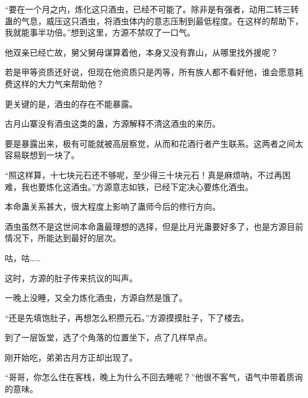 \begin{this_body}
“要在一个月之内，炼化这只酒虫，已经不可能了。除非是有强者，动用二转三转蛊的气息，威压这只酒虫，将酒虫体内的意志压制到最低程度。在这样的帮助下，我就能事半功倍。”想到这里，方源不禁叹了一口气。

他双亲已经亡故，舅父舅母谋算着他，本身又没有靠山，从哪里找外援呢？

若是甲等资质还好说，但现在他资质只是丙等，所有族人都不看好他，谁会愿意耗费这样的大力气来帮助他？

更关键的是，酒虫的存在不能暴露。

古月山寨没有酒虫这类的蛊，方源解释不清这酒虫的来历。

要是暴露出来，极有可能就被高层察觉，从而和花酒行者产生联系。这两者之间太容易联想到一块了。

“照这样算，十七块元石还不够呢，至少得三十块元石！真是麻烦呐，不过再困难，我也要炼化这酒虫。”方源意志如铁，已经下定决心要炼化酒虫。

本命蛊关系甚大，很大程度上影响了蛊师今后的修行方向。

酒虫虽然不是这世间本命蛊最理想的选择，但是比月光蛊要好多了，也是方源目前情况下，所能达到最好的层次。

咕，咕……

这时，方源的肚子传来抗议的叫声。

一晚上没睡，又全力炼化酒虫，方源自然是饿了。

“还是先填饱肚子，再想怎么积攒元石。”方源摸摸肚子，下了楼去。

到了一层饭堂，选了个角落的位置坐下，点了几样早点。

刚开始吃，弟弟古月方正却出现了。

“哥哥，你怎么住在客栈，晚上为什么不回去睡呢？”他很不客气，语气中带着质询的意味。

\end{this_body}

